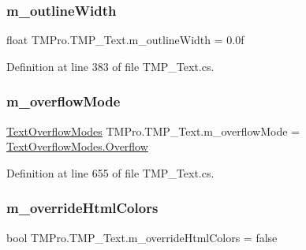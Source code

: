 \mbox{\label{class_t_m_pro_1_1_t_m_p___text_aed9637dab11ebe72893ad777fdf9aa2a}} 
\subsubsection{\texorpdfstring{m\_outlineWidth}{m\_outlineWidth}}
{\footnotesize\ttfamily float T\+M\+Pro.\+T\+M\+P\+\_\+\+Text.\+m\+\_\+outline\+Width = 0.\+0f\hspace{0.3cm}{\ttfamily [protected]}}



Definition at line 383 of file T\+M\+P\+\_\+\+Text.\+cs.

\mbox{\label{class_t_m_pro_1_1_t_m_p___text_a165a9c32280a9843ef12e7566266a954}} 
\subsubsection{\texorpdfstring{m\_overflowMode}{m\_overflowMode}}
{\footnotesize\ttfamily \mbox{\hyperlink{namespace_t_m_pro_a7234b7b8868aa9f0174e7db46e272a17}{Text\+Overflow\+Modes}} T\+M\+Pro.\+T\+M\+P\+\_\+\+Text.\+m\+\_\+overflow\+Mode = \mbox{\hyperlink{namespace_t_m_pro_a7234b7b8868aa9f0174e7db46e272a17a129e8109f319870e328cc7a1d5b5cae3}{Text\+Overflow\+Modes.\+Overflow}}\hspace{0.3cm}{\ttfamily [protected]}}



Definition at line 655 of file T\+M\+P\+\_\+\+Text.\+cs.

\mbox{\label{class_t_m_pro_1_1_t_m_p___text_a52dfbd8d5fcc873fa38b60fe266c391e}} 
\subsubsection{\texorpdfstring{m\_overrideHtmlColors}{m\_overrideHtmlColors}}
{\footnotesize\ttfamily bool T\+M\+Pro.\+T\+M\+P\+\_\+\+Text.\+m\+\_\+override\+Html\+Colors = false\hspace{0.3cm}{\ttfamily [protected]}}



